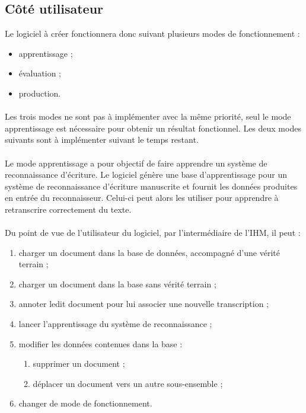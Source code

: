 \subsection{Côté utilisateur}

Le logiciel à créer fonctionnera donc suivant plusieurs modes de fonctionnement :
\begin{itemize}
	\item apprentissage ;
	\item évaluation ;
	\item production.
\end{itemize}

\paragraph{}
Les trois modes ne sont pas à implémenter avec la même priorité, seul le mode
apprentissage est nécessaire pour obtenir un résultat fonctionnel. Les deux
modes suivants sont à implémenter suivant le temps restant.

\paragraph{}
Le mode apprentissage a pour objectif de faire apprendre un système de
reconnaissance d’écriture. Le logiciel génère une base d’apprentissage pour un
système de reconnaissance d’écriture manuscrite et fournit les données
produites en entrée du reconnaisseur. Celui-ci peut alors les utiliser pour
apprendre à retranscrire correctement du texte.

\paragraph{}
Du point de vue de l'utilisateur du logiciel, par l’intermédiaire de l’IHM, il
peut :
\begin{enumerate}
\item charger un document dans la base de données, accompagné d’une vérité
terrain ;
\item charger un document dans la base sans vérité terrain ;
\item annoter ledit document pour lui associer une nouvelle transcription ;
\item lancer l’apprentissage du système de reconnaissance ;
\item modifier les données contenues dans la base :
\begin{enumerate}
\item supprimer un document ;
\item déplacer un document vers un autre sous-ensemble ;
\end{enumerate}
\item changer de mode de fonctionnement.
\end{enumerate}


